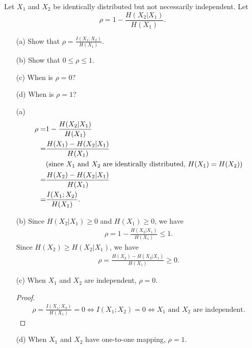 \documentclass{assignment}
\begin{document}
\begin{prob}
    Let $X_1$ and $X_2$ be identically distributed but not necessarily independent. Let
    \[
        \rho=1-\frac{H(X_2\vert X_1)}{H(X_1)}.
    \]
    \begin{itemize}
        \item[(a)] Show that $\rho=\frac{I(X_1;X_2)}{H(X_1)}$.
        \item[(b)] Show that $0\leq\rho\leq 1$.
        \item[(c)] When is $\rho=0$?
        \item[(d)] When is $\rho=1$?
    \end{itemize}
\end{prob}
\begin{sol}
    \begin{itemize}
        \item[(a)] 
        \begin{align}
            \notag\rho=&1-\frac{H(X_2\vert X_1)}{H(X_1)}\\
            \notag=&\frac{H(X_1)-H(X_2\vert X_1)}{H(X_1)}\\
            \notag&(\text{since }X_1\text{ and }X_2\text{ are identically distributed, }H(X_1)=H(X_2))\\
            \notag=&\frac{H(X_2)-H(X_2\vert X_1)}{H(X_1)}\\
            =&\frac{I(X_1;X_2)}{H(X_1)}.
        \end{align}
        \item[(b)] Since $H(X_2\vert X_1)\geq 0$ and $H(X_1)\geq 0$, we have
        \begin{align}
            \rho=1-\frac{H(X_2\vert X_1)}{H(X_1)}\leq 1.
        \end{align}
        Since $H(X_2)\geq H(X_2\vert X_1)$, we have
        \begin{align}
            \rho=\frac{H(X_2)-H(X_2\vert X_1)}{H(X_1)}\geq 0.
        \end{align}
        \item[(c)] When $X_1$ and $X_2$ are independent, $\rho=0$.
        \begin{proof}
            \begin{align}
                \rho=\frac{I(X_1;X_2)}{H(X_1)}=0\Longleftrightarrow I(X_1;X_2)=0\Longleftrightarrow X_1\text{ and }X_2\text{ are independent}.
            \end{align}
        \end{proof}
        \item[(d)] When $X_1$ and $X_2$ have one-to-one mapping, $\rho=1$.

\end{itemize}
\end{sol}
\end{document}
